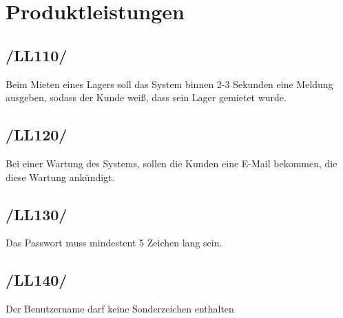 
\section{Produktleistungen}
\subsection*{/LL110/}
Beim Mieten eines Lagers soll das System binnen 2-3 Sekunden eine Meldung ausgeben, sodass der Kunde weiß, dass sein Lager gemietet wurde.
\subsection*{/LL120/}
Bei einer Wartung des Systems, sollen die Kunden eine E-Mail bekommen, die diese Wartung ankündigt.
\subsection*{/LL130/}
Das Passwort muss mindestent 5 Zeichen lang sein.
\subsection*{/LL140/}
Der Benutzername darf keine Sonderzeichen enthalten